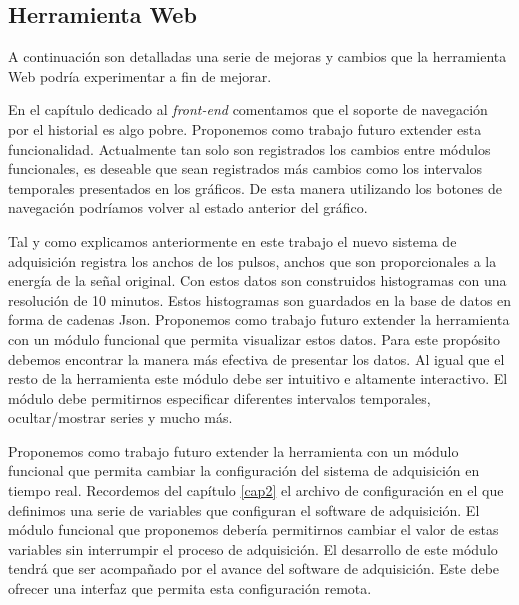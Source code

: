 	\subsection{Herramienta Web}
		A continuación son detalladas una serie de mejoras y cambios que la herramienta Web podría experimentar a fin de mejorar.
		\begin{description}[style=unboxed,leftmargin=0cm,labelwidth=1cm]
			\item[Extender el soporte de navegación por el historial]
				En el capítulo dedicado al \emph{front-end} comentamos que el soporte de navegación por el historial es algo pobre.
				Proponemos como trabajo futuro extender esta funcionalidad. Actualmente tan solo son registrados los cambios entre
				módulos funcionales, es deseable que sean registrados más cambios como los intervalos temporales presentados en los
				gráficos. De esta manera utilizando los botones de navegación podríamos volver al estado anterior del gráfico.
			\item[Anchos de pulso] 
				Tal y como explicamos anteriormente en este trabajo el nuevo sistema de adquisición registra los anchos de los pulsos,
				anchos que son proporcionales a la energía de la señal original. Con estos datos son construidos histogramas con una
				resolución de 10 minutos. Estos histogramas son guardados en la base de datos en forma de cadenas Json. Proponemos
				como trabajo futuro extender la herramienta con un módulo funcional que permita visualizar estos datos. Para este
				propósito debemos encontrar la manera más efectiva de presentar los datos.  Al igual que el resto de la herramienta
				este módulo debe ser intuitivo e altamente interactivo. El módulo debe permitirnos especificar diferentes intervalos
				temporales, ocultar/mostrar series y mucho más.
			\item[Configuración del sistema de adquisición]
				Proponemos como trabajo futuro extender la herramienta con un módulo funcional que permita cambiar la configuración
				del sistema de adquisición en tiempo real. Recordemos del capítulo \ref{cap2} el archivo de configuración en el que
				definimos una serie de variables que configuran el software de adquisición. El módulo funcional que proponemos debería
				permitirnos cambiar el valor de estas variables sin interrumpir el proceso de adquisición. El desarrollo de este
				módulo tendrá que ser acompañado por el avance del software de adquisición. Este debe ofrecer una interfaz que permita
				esta configuración remota.
			\item[Alarmas y Notificación]

\end{description}
